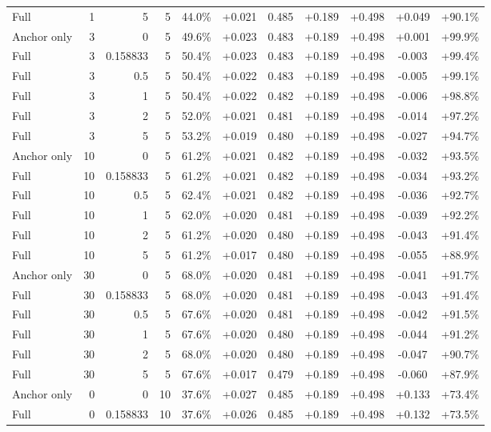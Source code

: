 \begin{table}[htbp]
\begin{tabular}{lrrrccccccc}
Full & 1 & 5 & 5 & 44.0\% & +0.021 & 0.485 & +0.189 & +0.498 & +0.049 & +90.1\% \\
Anchor only & 3 & 0 & 5 & 49.6\% & +0.023 & 0.483 & +0.189 & +0.498 & +0.001 & +99.9\% \\
Full & 3 & 0.158833 & 5 & 50.4\% & +0.023 & 0.483 & +0.189 & +0.498 & -0.003 & +99.4\% \\
Full & 3 & 0.5 & 5 & 50.4\% & +0.022 & 0.483 & +0.189 & +0.498 & -0.005 & +99.1\% \\
Full & 3 & 1 & 5 & 50.4\% & +0.022 & 0.482 & +0.189 & +0.498 & -0.006 & +98.8\% \\
Full & 3 & 2 & 5 & 52.0\% & +0.021 & 0.481 & +0.189 & +0.498 & -0.014 & +97.2\% \\
Full & 3 & 5 & 5 & 53.2\% & +0.019 & 0.480 & +0.189 & +0.498 & -0.027 & +94.7\% \\
Anchor only & 10 & 0 & 5 & 61.2\% & +0.021 & 0.482 & +0.189 & +0.498 & -0.032 & +93.5\% \\
Full & 10 & 0.158833 & 5 & 61.2\% & +0.021 & 0.482 & +0.189 & +0.498 & -0.034 & +93.2\% \\
Full & 10 & 0.5 & 5 & 62.4\% & +0.021 & 0.482 & +0.189 & +0.498 & -0.036 & +92.7\% \\
Full & 10 & 1 & 5 & 62.0\% & +0.020 & 0.481 & +0.189 & +0.498 & -0.039 & +92.2\% \\
Full & 10 & 2 & 5 & 61.2\% & +0.020 & 0.480 & +0.189 & +0.498 & -0.043 & +91.4\% \\
Full & 10 & 5 & 5 & 61.2\% & +0.017 & 0.480 & +0.189 & +0.498 & -0.055 & +88.9\% \\
Anchor only & 30 & 0 & 5 & 68.0\% & +0.020 & 0.481 & +0.189 & +0.498 & -0.041 & +91.7\% \\
Full & 30 & 0.158833 & 5 & 68.0\% & +0.020 & 0.481 & +0.189 & +0.498 & -0.043 & +91.4\% \\
Full & 30 & 0.5 & 5 & 67.6\% & +0.020 & 0.481 & +0.189 & +0.498 & -0.042 & +91.5\% \\
Full & 30 & 1 & 5 & 67.6\% & +0.020 & 0.480 & +0.189 & +0.498 & -0.044 & +91.2\% \\
Full & 30 & 2 & 5 & 68.0\% & +0.020 & 0.480 & +0.189 & +0.498 & -0.047 & +90.7\% \\
Full & 30 & 5 & 5 & 67.6\% & +0.017 & 0.479 & +0.189 & +0.498 & -0.060 & +87.9\% \\
Anchor only & 0 & 0 & 10 & 37.6\% & +0.027 & 0.485 & +0.189 & +0.498 & +0.133 & +73.4\% \\
Full & 0 & 0.158833 & 10 & 37.6\% & +0.026 & 0.485 & +0.189 & +0.498 & +0.132 & +73.5\% \\

\end{tabular}
\end{table}
